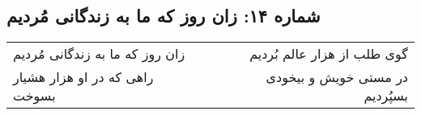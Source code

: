 \begin{center}
\section*{شماره ۱۴: زان روز که ما به زندگانی مُردیم}
\label{sec:014}
\begin{longtable}{l p{0.5cm} r}
زان روز که ما به زندگانی مُردیم
&&
گوی طلب از هزار عالم بُردیم
\\
راهی که در او هزار هشیار بسوخت
&&
در مستی خویش و بیخودی بسپُردیم
\\
\end{longtable}
\end{center}
